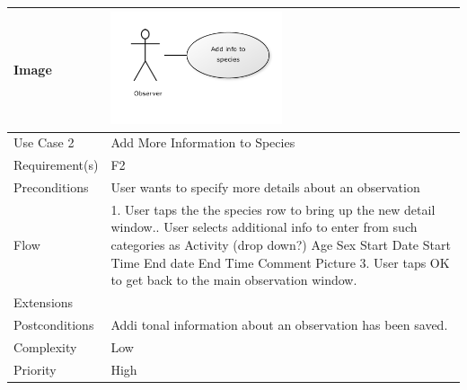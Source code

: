 \begin{tabular}[t]{|l|p{}|}\hline
	Image&\includegraphics[width=0.5\textwidth]{reqspec/uc/addinfo.png} \\\hline
	Use Case 2&Add More Information to Species\\\hline
	Requirement(s)&F2\\\hline
	Preconditions&User wants to specify more details about an observation\\\hline
	Flow& 1. User taps the the species row to bring up the new detail window.\newline
	2. User selects additional info to enter from such categories as \newline
	Activity (drop down?) \newline
	Age\newline
	Sex\newline
	Start Date\newline
	Start Time\newline
	End date \newline
	End Time \newline
	Comment \newline
	Picture \newline
	3. User taps OK to get back to the main observation window.\\\hline
	Extensions& \\\hline
	Postconditions&Addi tonal information about an observation has been saved.\\\hline
	Complexity&Low\\\hline
	Priority&High\\\hline
\end{tabular}

